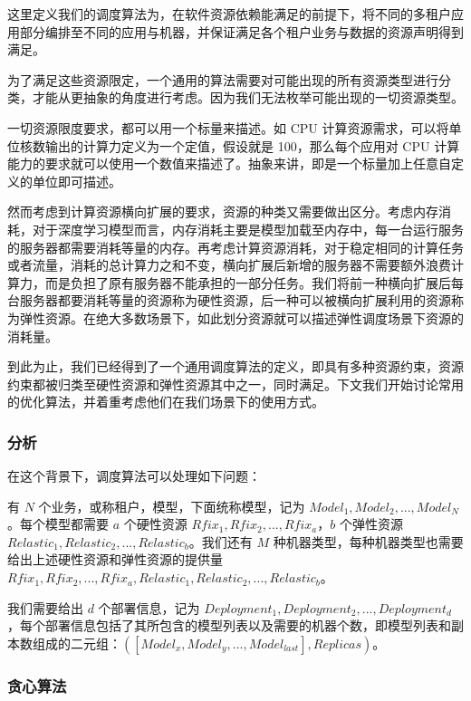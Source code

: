 这里定义我们的调度算法为，在软件资源依赖能满足的前提下，将不同的多租户应用部分编排至不同的应用与机器，并保证满足各个租户业务与数据的资源声明得到满足。

为了满足这些资源限定，一个通用的算法需要对可能出现的所有资源类型进行分类，才能从更抽象的角度进行考虑。因为我们无法枚举可能出现的一切资源类型。

一切资源限度要求，都可以用一个标量来描述。如 CPU 计算资源需求，可以将单位核数输出的计算力定义为一个定值，假设就是 100，那么每个应用对 CPU 计算能力的要求就可以使用一个数值来描述了。抽象来讲，即是一个标量加上任意自定义的单位即可描述。

然而考虑到计算资源横向扩展的要求，资源的种类又需要做出区分。考虑内存消耗，对于深度学习模型而言，内存消耗主要是模型加载至内存中，每一台运行服务的服务器都需要消耗等量的内存。再考虑计算资源消耗，对于稳定相同的计算任务或者流量，消耗的总计算力之和不变，横向扩展后新增的服务器不需要额外浪费计算力，而是负担了原有服务器不能承担的一部分任务。我们将前一种横向扩展后每台服务器都要消耗等量的资源称为硬性资源，后一种可以被横向扩展利用的资源称为弹性资源。在绝大多数场景下，如此划分资源就可以描述弹性调度场景下资源的消耗量。

到此为止，我们已经得到了一个通用调度算法的定义，即具有多种资源约束，资源约束都被归类至硬性资源和弹性资源其中之一，同时满足。下文我们开始讨论常用的优化算法，并着重考虑他们在我们场景下的使用方式。

\subsubsection{分析}

在这个背景下，调度算法可以处理如下问题：

有 $N$ 个业务，或称租户，模型，下面统称模型，记为 $Model_1,Model_2,...,Model_N$。每个模型都需要 $a$ 个硬性资源 $Rfix_1,Rfix_2,...,Rfix_a$，$b$ 个弹性资源 $Relastic_1,Relastic_2,...,Relastic_b$。我们还有 $M$ 种机器类型，每种机器类型也需要给出上述硬性资源和弹性资源的提供量 $Rfix_1,Rfix_2,...,Rfix_a,Relastic_1,Relastic_2,...,Relastic_b$。

我们需要给出 $d$ 个部署信息，记为 $Deployment_1,Deployment_2,...,Deployment_d$，每个部署信息包括了其所包含的模型列表以及需要的机器个数，即模型列表和副本数组成的二元组：$([Model_x,Model_y,...,Model_{last}],Replicas)$。

\subsubsection{贪心算法}

